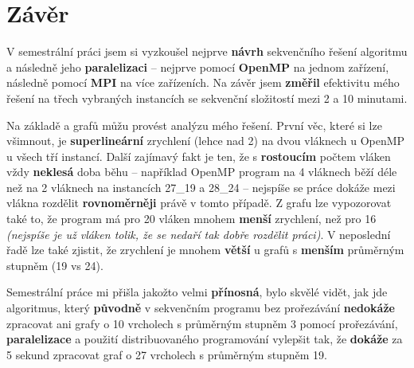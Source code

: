 \section{Závěr}
\label{5_end}

V semestrální práci jsem si vyzkoušel nejprve \textbf{návrh} sekvenčního řešení algoritmu a následně jeho \textbf{paralelizaci} -- nejprve pomocí \textbf{OpenMP} na jednom zařízení, následně pomocí \textbf{MPI} na více zařízeních. Na závěr jsem \textbf{změřil} efektivitu mého řešení na třech vybraných instancích se sekvenční složitostí mezi 2 a 10 minutami.

Na základě  a grafů   můžu provést analýzu mého řešení. První věc, které si lze všimnout, je \textbf{superlineární} zrychlení (lehce nad 2) na dvou vláknech u OpenMP u všech tří instancí. Další zajímavý fakt je ten, že s \textbf{rostoucím} počtem vláken vždy \textbf{neklesá} doba běhu -- například OpenMP program na 4 vláknech běží déle než na 2 vláknech na instancích 27\_19 a 28\_24 -- nejspíše se práce dokáže mezi vlákna rozdělit \textbf{rovnoměrněji} právě v tomto případě. Z grafu lze vypozorovat také to, že program má pro 20 vláken mnohem \textbf{menší} zrychlení, než pro 16 \textit{(nejspíše je už vláken tolik, že se nedaří tak dobře rozdělit práci)}. V neposlední řadě lze také zjistit, že zrychlení je mnohem \textbf{větší} u grafů s \textbf{menším} průměrným stupněm (19 vs 24).

Semestrální práce mi přišla jakožto velmi \textbf{přínosná}, bylo skvělé vidět, jak jde algoritmus, který \textbf{původně} v sekvenčním programu bez prořezávání \textbf{nedokáže} zpracovat ani grafy o 10 vrcholech s průměrným stupněm 3 pomocí prořezávání, \textbf{paralelizace} a použití distribuovaného programování vylepšit tak, že \textbf{dokáže} za 5 sekund zpracovat graf o 27 vrcholech s průměrným stupněm 19.
